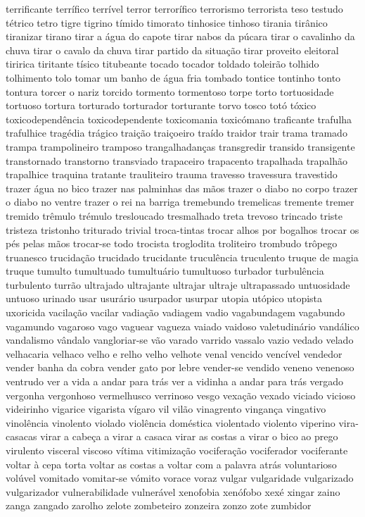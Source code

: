 \begin{appendices}
terrificante terr\'{i}fico terr\'{i}vel terror terror\'{i}fico terrorismo terrorista teso testudo t\'{e}trico tetro tigre tigrino t\'{i}mido timorato tinhosice tinhoso tirania tir\^{a}nico tiranizar tirano tirar a \'{a}gua do capote tirar nabos da p\'{u}cara tirar o cavalinho da chuva tirar o cavalo da chuva tirar partido da situa\c{c}\~ao tirar proveito eleitoral tiririca tiritante t\'{i}sico titubeante tocado tocador toldado toleir\~ao tolhido tolhimento tolo tomar um banho de \'{a}gua fria tombado tontice tontinho tonto tontura torcer o nariz torcido tormento tormentoso torpe torto tortuosidade tortuoso tortura torturado torturador torturante torvo tosco tot\'{o} t\'{o}xico toxicodepend\^{e}ncia toxicodependente toxicomania toxic\'{o}mano traficante trafulha trafulhice trag\'{e}dia tr\'{a}gico trai\c{c}\~ao trai\c{c}oeiro tra\'{i}do traidor trair trama tramado trampa trampolineiro tramposo trangalhadan\c{c}as transgredir transido transigente transtornado transtorno transviado trapaceiro trapacento trapalhada trapalh\~ao trapalhice traquina tratante trauliteiro trauma travesso travessura travestido trazer \'{a}gua no bico trazer nas palminhas das m\~aos trazer o diabo no corpo trazer o diabo no ventre trazer o rei na barriga tremebundo tremelicas tremente tremer tremido tr\^{e}mulo tr\'{e}mulo tresloucado tresmalhado treta trevoso trincado triste tristeza tristonho triturado trivial troca-tintas trocar alhos por bogalhos trocar os p\'{e}s pelas m\~aos trocar-se todo trocista troglodita troliteiro trombudo tr\^{o}pego truanesco trucida\c{c}\~ao trucidado trucidante trucul\^{e}ncia truculento truque de magia truque tumulto tumultuado tumultu\'{a}rio tumultuoso turbador turbul\^{e}ncia turbulento turr\~ao ultrajado ultrajante ultrajar ultraje ultrapassado untuosidade untuoso urinado usar usur\'{a}rio usurpador usurpar utopia ut\'{o}pico utopista uxoricida vacila\c{c}\~ao vacilar vadia\c{c}\~ao vadiagem vadio vagabundagem vagabundo vagamundo vagaroso vago vaguear vagueza vaiado vaidoso valetudin\'{a}rio vand\'{a}lico vandalismo v\^{a}ndalo vangloriar-se v\~ao varado varrido vassalo vazio vedado velado velhacaria velhaco velho e relho velho velhote venal vencido venc\'{i}vel vendedor vender banha da cobra vender gato por lebre vender-se vendido veneno venenoso ventrudo ver a vida a andar para tr\'{a}s ver a vidinha a andar para tr\'{a}s vergado vergonha vergonhoso vermelhusco verrinoso vesgo vexa\c{c}\~ao vexado viciado vicioso videirinho vigarice vigarista v\'{i}garo vil vil\~ao vinagrento vingan\c{c}a vingativo vinol\^{e}ncia vinolento violado viol\^{e}ncia dom\'{e}stica violentado violento viperino vira-casacas virar a cabe\c{c}a a virar a casaca virar as costas a virar o bico ao prego virulento visceral viscoso v\'{i}tima vitimiza\c{c}\~ao vocifera\c{c}\~ao vociferador vociferante voltar \`{a} cepa torta voltar as costas a voltar com a palavra atr\'{a}s voluntarioso vol\'{u}vel vomitado vomitar-se v\'{o}mito vorace voraz vulgar vulgaridade vulgarizado vulgarizador vulnerabilidade vulner\'{a}vel xenofobia xen\'{o}fobo xex\'{e} xingar zaino zanga zangado zarolho zelote zombeteiro zonzeira zonzo zote zumbidor 


\end{appendices}

